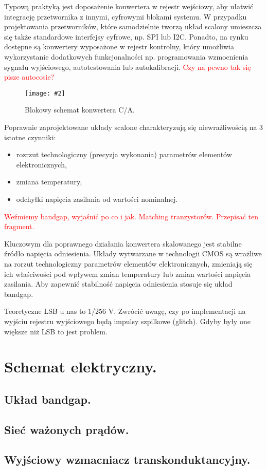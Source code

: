 \documentclass[10pt,a4paper]{report}
\newcommand{\img}[4]{
	\begin{figure}[H]
		\begin{center}
			\texttt{[image: \#2]}
			\caption{#3}
			\label{#4}
		\end{center}
	\end{figure}
}
\begin{document}
	{	Typową praktyką jest doposażenie konwertera w rejestr wejściowy, aby ułatwić integrację przetwornika z innymi, cyfrowymi blokami systemu. W przypadku projektowania przetworników, które samodzielnie tworzą układ scalony umieszcza się także standardowe interfejsy cyfrowe, np. SPI lub I2C. Ponadto, na rynku dostępne są konwertery wyposażone w rejestr kontrolny, który umożliwia wykorzystanie dodatkowych funkcjonalności np. programowania wzmocnienia sygnału wyjściowego, autotestowania lub autokalibracji. \textcolor{red}{Czy na pewno tak się pisze autocosie?}
		\img{20}{../visio/blokschkonca.pdf}{Blokowy schemat konwertera C/A.}{blokschkonca} }

	{	Poprawnie zaprojektowane układy scalone charakteryzują się niewrażliwością na 3 istotne czynniki:
		\begin{itemize}
			\item rozrzut technologiczny (precyzja wykonania) parametrów elementów elektronicznych,
			\item zmiana temperatury,
			\item odchyłki napięcia zasilania od wartości nominalnej.
		\end{itemize}
		\textcolor{red}{Weźmiemy bandgap, wyjaśnić po co i jak. Matching tranzystorów. Przepisać ten fragment.}	}
	
	{	Kluczowym dla poprawnego działania konwertera skalowanego jest stabilne źródło napięcia odniesienia. Układy wytwarzane w technologii CMOS są wrażliwe na rorzut technologiczny parametrów elementów elektronicznych, zmieniają się ich właściwości pod wpływem zmian temperatury lub zmian wartości napięcia zasilania. Aby zapewnić stabilność napięcia odniesienia stosuje się układ bandgap. }

	{	Teoretyczne LSB u nas to 1/256 V. Zwrócić uwagę, czy po implementacji na wyjściu rejestru wyjściowego będą impulsy szpilkowe (glitch). Gdyby były one większe niż LSB to jest problem.
		}
	\chapter{Schemat elektryczny.}
	\section{Układ bandgap.}
	\section{Sieć ważonych prądów.}
	\section{Wyjściowy wzmacniacz transkonduktancyjny.}
\end{document}
